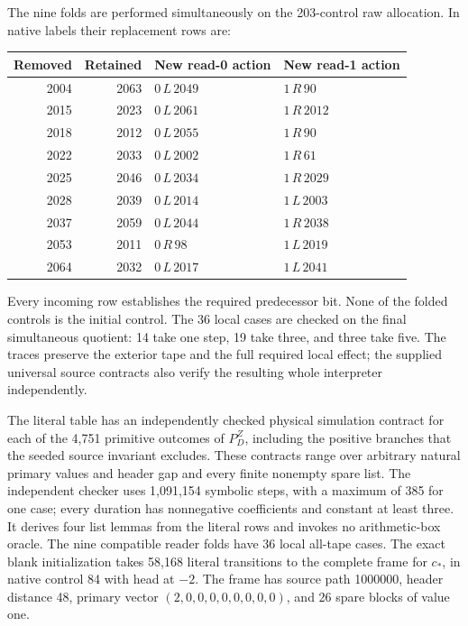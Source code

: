 The nine folds are performed simultaneously on the 203-control raw
allocation. In native labels their replacement rows are:
\begin{center}\small
\begin{tabular}{@{}rrll@{}}
\toprule
Removed & Retained & New read-0 action & New read-1 action\\
\midrule
2004 & 2063 & $0\,L\,2049$ & $1\,R\,90$\\
2015 & 2023 & $0\,L\,2061$ & $1\,R\,2012$\\
2018 & 2012 & $0\,L\,2055$ & $1\,R\,90$\\
2022 & 2033 & $0\,L\,2002$ & $1\,R\,61$\\
2025 & 2046 & $0\,L\,2034$ & $1\,R\,2029$\\
2028 & 2039 & $0\,L\,2014$ & $1\,L\,2003$\\
2037 & 2059 & $0\,L\,2044$ & $1\,R\,2038$\\
2053 & 2011 & $0\,R\,98$ & $1\,L\,2019$\\
2064 & 2032 & $0\,L\,2017$ & $1\,L\,2041$\\
\bottomrule
\end{tabular}
\end{center}
Every incoming row establishes the required predecessor bit. None of the
folded controls is the initial control. The 36 local cases are checked
on the final simultaneous quotient: 14 take one step, 19 take three,
and three take five. The traces preserve the exterior tape and the full
required local effect; the supplied universal source contracts also
verify the resulting whole interpreter independently.

The literal table has an independently checked physical simulation
contract for each of the 4,751 primitive outcomes of \(P_D^Z\), including the positive
branches that the seeded source invariant excludes.  These contracts
range over arbitrary natural primary values and header gap and every
finite nonempty spare list.  The independent checker uses 1,091,154
symbolic steps, with a maximum of 385 for one case; every duration has
nonnegative coefficients and constant at least three.  It derives four
list lemmas from the literal rows and invokes no arithmetic-box oracle.
The nine compatible reader folds have 36 local all-tape cases.
The exact blank initialization takes 58,168
literal transitions to the complete frame for \(c_*\), in native
control 84 with head at \(-2\).  The frame has source path 1000000,
header distance 48, primary vector \((2,0,0,0,0,0,0,0,0)\), and
26 spare blocks of value one.


